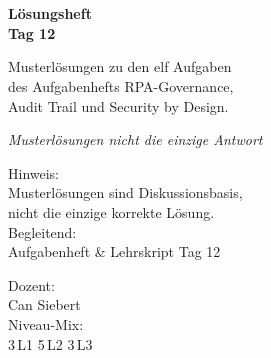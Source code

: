 \documentclass[11pt,a4paper,oneside]{article}
\newcommand{\caveatfontfallback}{\itshape}
\newcommand\caveatfont{\caveatfontfallback}%
\begin{document}
\begin{titlepage}
  \pagestyle{empty}
  \vspace*{1.5cm}
  \\[2pt]
  \noindent{\color{lpAccent}\rule{\linewidth}{1.2pt}}\\[4pt]

  \vspace{3cm}
  {\sffamily\fontsize{30}{34}\selectfont\bfseries\color{lpInk}L\"osungsheft\\Tag 12\par}

  \vspace{0.7cm}
  {\sffamily\large\color{lpGray}Musterl\"osungen zu den elf Aufgaben\\des Aufgabenhefts \textendash{} RPA-Governance,\\Audit Trail und Security by Design.\par}

  \vspace{1.5cm}
  {\caveatfont\LARGE\color{lpGreen}Musterl\"osungen \textperiodcentered{} nicht die einzige Antwort}\par

  \vfill

  \noindent\begin{minipage}{0.55\linewidth}
    {\sffamily\footnotesize\color{lpGray}Hinweis:}\\
    {\sffamily\small\color{lpInk}Musterl\"osungen sind Diskussionsbasis,\\nicht die einzige korrekte L\"osung.}\\[10pt]
    {\sffamily\footnotesize\color{lpGray}Begleitend:}\\
    {\sffamily\small\color{lpInk}Aufgabenheft \& Lehrskript Tag 12}
  \end{minipage}\hfill
  \begin{minipage}{0.4\linewidth}
    \raggedleft
    {\sffamily\footnotesize\color{lpGray}Dozent:}\\
    {\sffamily\small\color{lpInk}Can Siebert}\\[10pt]
    {\sffamily\footnotesize\color{lpGray}Niveau-Mix:}\\
    {\sffamily\small\color{lpInk}3\,L1 \textperiodcentered{} 5\,L2 \textperiodcentered{} 3\,L3}
  \end{minipage}

  \vspace{0.5cm}
  \noindent{\color{lpAccent}\rule{\linewidth}{0.6pt}}
\end{titlepage}
\end{document}
